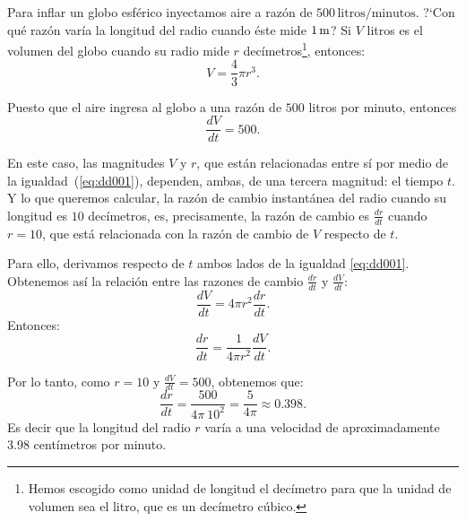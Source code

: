 \begin{exemplo}[Solución]{%
Para inflar un globo esférico inyectamos aire a razón de $500\, \text{litros}/\text{minutos}$. ?`Con qué
razón varía la longitud del radio cuando éste mide $1\operatorname{m}$?
}%
Si $V$ litros es el volumen del globo cuando su radio mide $r$ decímetros\footnote{Hemos escogido
como unidad de longitud el decímetro para que la unidad de volumen sea el litro, que es un
decímetro cúbico.}, entonces:
\begin{equation}
\label{eq:dd001}
	V=\frac{4}{3}\pi r^{3}.
\end{equation}

Puesto que el aire ingresa al globo a una razón de $500$ litros por minuto, entonces
\[
\frac{dV}{dt}=500.
\]

En este caso, las magnitudes $V$ y $r$, que están relacionadas entre sí por medio de la
igualdad~(\ref{eq:dd001}), dependen, ambas, de una tercera magnitud: el tiempo $t$. Y lo que
queremos calcular, la razón de cambio instantánea del radio cuando su longitud es $10$ decímetros,
es, precisamente, la razón de cambio es $\frac{dr}{dt}$ cuando $r=10$, que está relacionada con la
razón de cambio de $V$ respecto de $t$.

Para ello, derivamos respecto de $t$ ambos lados de la igualdad \ref{eq:dd001}. Obtenemos así la
relación entre las razones de cambio $\frac{dr}{dt}$ y $\frac{dV}{dt}$:
\begin{equation*}
	\frac{dV}{dt}=4\pi r^{2}\frac{dr}{dt}.
\end{equation*}
Entonces:
\begin{equation*}
	\frac{dr}{dt}=\frac{1}{4\pi r^{2}}\frac{dV}{dt}.
\end{equation*}

Por lo tanto, como $r=10$ y  $\frac{dV}{dt}=500$, obtenemos que:
\begin{equation*}
	\frac{dr}{dt}=\frac{500}{4\pi\  10^{2}}=\frac{5}{4\pi}\approx 0.398.
\end{equation*}
Es decir que la longitud del radio $r$ varía a una velocidad de aproximadamente $3.98$ centímetros
por minuto.
\end{exemplo}

